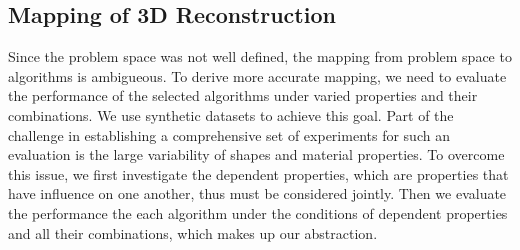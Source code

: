 \subsection{Mapping of 3D Reconstruction}
Since the problem space was not well defined, the mapping from problem space to algorithms is ambigueous. To derive more accurate mapping, we need to evaluate the performance of the selected algorithms under varied properties and their combinations. We use synthetic datasets to achieve this goal. Part of the challenge in establishing a comprehensive set of experiments for such an evaluation is the large variability of shapes and material properties. To overcome this issue, we first investigate the dependent properties, which are properties that have influence on one another, thus must be considered jointly. Then we evaluate the performance the each algorithm under the conditions of dependent properties and all their combinations, which makes up our abstraction.

